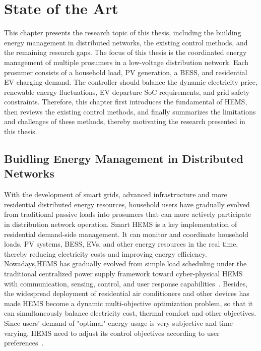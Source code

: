 
\chapter{State of the Art}\label{chapter:state-of-art}

This chapter presents the research topic of this thesis, including the building energy management in distributed networks, the existing control methods, and the remaining research gaps. The focus of this thesis is the coordinated energy management of multiple prosumers in a low-voltage distribution network. Each prosumer consists of a household load, PV generation, a BESS, and residential EV charging demand. The controller should balance the dynamic electricity price, renewable energy fluctuations, EV departure SoC requirements, and grid safety constraints. Therefore, this chapter first introduces the fundamental of HEMS, then reviews the existing control methods, and finally summarizes the limitations and challenges of these methods, thereby motivating the research presented in this thesis.

\section{Buidling Energy Management in Distributed Networks}

With the development of smart grids, advanced infrastructure and more residential distributed energy resources, household users have gradually evolved from traditional passive loads into prosumers that can more actively participate in distribution network operation. Smart HEMS is a key implementation of residential demand-side management. It can monitor and coordinate household loads, PV systems, BESS, EVs, and other energy resources in the real time, thereby reducing electricity costs and improving energy efficiency. Nowadays,HEMS has gradually evolved from simple load scheduling under the traditional centralized power supply framework toward cyber-physical HEMS with communication, sensing, control, and user response capabilities~\parencite{ZHOU201630}. Besides, the widespread deployment of residential air conditioners and other devices has made HEMS become a dynamic multi-objective optimization problem, so that it can simultaneously balance electricity cost, thermal comfort and other objectives. Since users' demand of "optimal" energy usage is very subjective and time-varying, HEMS need to adjust its control objectives according to user preferences~\parencite{DU2026127976}.

